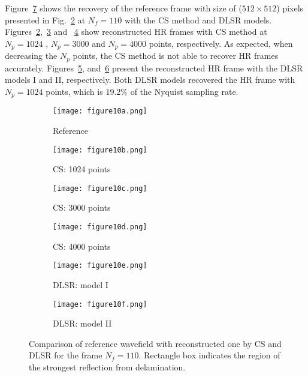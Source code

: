 Figure~\ref{fig:frame110_comparison} shows the recovery of the reference frame with size of (\(512\times512\)) pixels presented in Fig.~\ref{fig:frame110_CS1024} at $N_f=110$ with the CS method and DLSR models.
Figures~\ref{fig:frame110_CS1024},~\ref{fig:frame110_CS3000} and ~\ref{fig:frame110_CS4000} show reconstructed HR frames with CS method at $N_p=1024$ , $N_p=3000$ and $N_p=4000$ points, respectively.
As expected, when decreasing the $N_p$ points, the CS method is not able to recover HR frames accurately.
Figures~\ref{fig:frame110_Abdalraheem}, and~\ref{fig:frame110_Saeed} present the reconstructed HR frame with the DLSR models I and II, respectively.
Both DLSR models recovered the HR frame with $N_p=1024$ points, which is \(19.2\%\) of the Nyquist sampling rate.

\begin{figure} []
	\centering
	\begin{subfigure}[b]{0.32\textwidth}
		\centering
		\texttt{[image: figure10a.png]}
		\caption{Reference}
		\label{fig:frame110_ref}
	\end{subfigure}
	\hfill
	\begin{subfigure}[b]{0.32\textwidth}
		\centering
		\texttt{[image: figure10b.png]}
		\caption{CS: 1024 points}
		\label{fig:frame110_CS1024}
	\end{subfigure}
	\hfill
	\begin{subfigure}[b]{0.32\textwidth}
		\centering
		\texttt{[image: figure10c.png]}
		\caption{CS: 3000 points}
		\label{fig:frame110_CS3000}
	\end{subfigure}	
	\hfill
	\begin{subfigure}[b]{0.32\textwidth}
		\centering
		\texttt{[image: figure10d.png]}
		\caption{CS: 4000 points}
		\label{fig:frame110_CS4000}
	\end{subfigure}
	\hfill
	\begin{subfigure}[b]{0.32\textwidth}
		\centering
		\texttt{[image: figure10e.png]}
		\caption{DLSR: model I}
		\label{fig:frame110_Abdalraheem}
	\end{subfigure}
	\hfill
	\begin{subfigure}[b]{0.32\textwidth}
		\centering
		\texttt{[image: figure10f.png]}
		\caption{DLSR: model II}
		\label{fig:frame110_Saeed}
	\end{subfigure}
	
	\caption{Comparison of reference wavefield with reconstructed one by CS and DLSR for the frame $N_f = 110$. Rectangle box indicates the region of the strongest reflection from delamination.}
	\label{fig:frame110_comparison}
\end{figure} 

